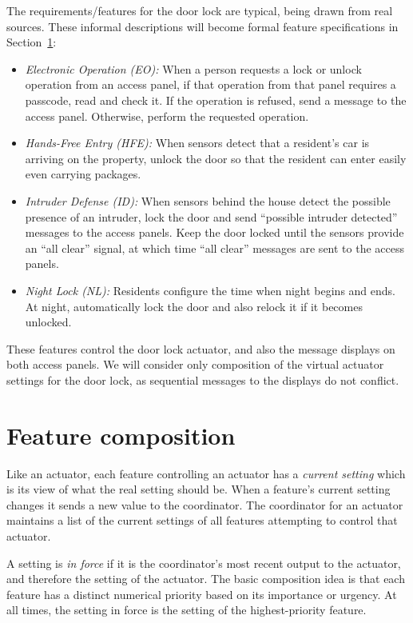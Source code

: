 \documentclass[conference]{IEEEtran}
\begin{document}
The requirements/features for the door lock
are typical, being drawn from real
sources.
These informal descriptions will become formal feature specifications
in Section~\ref{sec:composition}:
\begin{itemize}
\item
{\it Electronic Operation (EO):} When a person requests a lock
or unlock operation from an access panel, if that operation from that
panel requires a passcode, read and check it.
If the operation is refused, send a message to the access panel.
Otherwise, perform the requested operation. 
\item
{\it Hands-Free Entry (HFE):} When sensors detect that a resident's car
is arriving on the property, 
unlock the door so that the resident can enter
easily even carrying packages.
\item
{\it Intruder Defense (ID):} 
When sensors behind the house detect the possible
presence of an intruder, lock the door and send ``possible intruder
detected'' messages to the access panels.
Keep the door locked until the sensors provide
an ``all clear'' signal, at which time ``all clear'' messages are sent
to the access panels.
\item
{\it Night Lock (NL):} Residents configure
the time when night begins and ends.
At night, automatically lock the door and also relock it if it
becomes unlocked.
\end{itemize}
These features control the door lock actuator, and also the message
displays on both access panels.
We will consider only composition of the virtual actuator settings
for the door lock, as sequential messages to the displays do not conflict.

\section{Feature composition}
\label{sec:composition}

Like an actuator, each feature controlling an actuator has a
{\it current setting} which is its view of what the real setting should be.
When a feature's current setting changes it sends a new value to the
coordinator. 
The coordinator for an actuator
maintains a list of the current settings of all features
attempting to control that actuator.

A setting is {\it in force} if it is the coordinator's most recent
output to the actuator, and therefore the setting of the actuator.
The basic composition idea is that each feature
has a distinct numerical priority based on its importance or urgency.
At all times, the setting in force is the setting of the highest-priority
feature.
\end{document}
